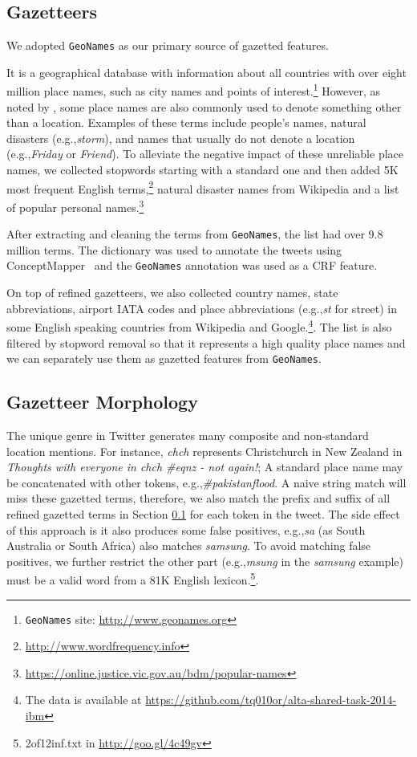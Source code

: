 \documentclass[11pt]{article}
\newcommand{\eg}{e.g.,\xspace}
\newcommand{\geoname}{\texttt{GeoNames}\xspace}
\newcommand{\myex}[1]{\textit{#1}}
\newcommand{\myurl}[1]{{\footnotesize\url{#1}}}
\newcommand{\secref}[2][]{Section#1 \ref{#2}}
\begin{document}
\subsection{Gazetteers}
\label{sec:gaze_feature}

We adopted \geoname as our primary source of gazetted features.

It is a geographical database with information about all countries with over eight million place names, such as city names and points of interest.\footnote{\geoname site: \myurl{http://www.geonames.org}} 
However, as noted by , some place names are also commonly used to denote something other than a location.
Examples of these terms include people's names, natural disasters (\eg \myex{storm}), and names that usually do not denote a location (\eg \myex{Friday} or \myex{Friend}).
To alleviate the negative impact of these unreliable place names, we collected stopwords starting with a standard one and then added 5K most frequent English terms,\footnote{\myurl{http://www.wordfrequency.info}} natural disaster names from Wikipedia and a list of popular personal names.\footnote{\myurl{https://online.justice.vic.gov.au/bdm/popular-names}}

After extracting and cleaning the terms from \geoname, the list had over 9.8 million terms.
The dictionary was used to annotate the tweets using ConceptMapper~\cite{tanenblatt2010conceptmapper} and the \geoname annotation was used as a CRF feature.

On top of refined gazetteers, we also collected country names, state abbreviations, airport IATA codes and place abbreviations (\eg \myex{st} for street) in some English speaking countries from Wikipedia and Google.\footnote{The data is available at \myurl{https://github.com/tq010or/alta-shared-task-2014-ibm}}.
The list is also filtered by stopword removal so that it represents a high quality place names and we can separately use them as gazetted features from \geoname.

\subsection{Gazetteer Morphology}
\label{sec:mor_feature}

The unique genre in Twitter generates many composite and non-standard location mentions.
For instance, \myex{chch} represents Christchurch in New Zealand in \myex{Thoughts with everyone in chch \#eqnz - not again!}; 
A standard place name may be concatenated with other tokens, \eg \myex{\#pakistanflood}.
A naive string match will miss these gazetted terms, therefore, we also match the prefix and suffix of all refined gazetted terms in \secref{sec:gaze_feature} for each token in the tweet.
The side effect of this approach is it also produces some false positives, \eg \myex{sa} (as South Australia or South Africa) also matches \myex{samsung}.
To avoid matching false positives, we further restrict the other part (\eg \myex{msung} in the \myex{samsung} example) must be a valid word from a 81K English lexicon.\footnote{2of12inf.txt in \myurl{http://goo.gl/4c49gv}}.
\end{document}
